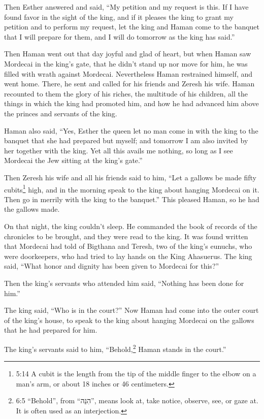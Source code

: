 \myverse{}Then Esther answered and said, “My petition and my request is this.
\myverse{}If I have found favor in the sight of the king, and if it pleases the king to
grant my petition and to perform my request, let the king and Haman come to the banquet that I will prepare
for them, and I will do tomorrow as the king has said.”

\myverse{}Then Haman went out that day joyful and glad of heart, but when
Haman saw Mordecai in the king’s gate, that he didn’t stand up nor move for him, he was filled with wrath
against Mordecai.
\myverse{}Nevertheless Haman restrained himself, and went home. There, he sent and called
for his friends and Zeresh his wife.
\myverse{}Haman recounted to them the glory of his riches, the multitude of his children,
all the things in which the king had promoted him, and how he had advanced him above the princes and servants
of the king.

\myverse{}Haman also said, “Yes, Esther the queen let no man come in with
the king to the banquet that she had prepared but myself; and tomorrow I am also invited by her together
with the king.
\myverse{}Yet all this avails me nothing, so long as I see Mordecai the Jew sitting
at the king’s gate.”

\myverse{}Then Zeresh his wife and all his friends said to him, “Let a
gallows be made fifty cubits\footnote{5:14 A cubit is the length from the tip of the middle finger to the elbow on a man’s arm, or about
	18 inches or 46 centimeters.} high, and in the morning speak to the king about hanging Mordecai
on it. Then go in merrily with the king to the banquet.” This pleased Haman, so he had the gallows made.


\mychapter{}\myverse*{}On that night, the king couldn’t sleep. He commanded the book of
records of the chronicles to be brought, and they were read to the king.
\myverse{}It was found written that Mordecai had told of Bigthana and Teresh, two of the
king’s eunuchs, who were doorkeepers, who had tried to lay hands on the King Ahasuerus.
\myverse{}The king said, “What honor and dignity has been given to Mordecai for this?”

Then the king’s servants who attended him said, “Nothing has been done for him.”

\myverse{}The king said, “Who is in the court?” Now Haman had come into the
outer court of the king’s house, to speak to the king about hanging Mordecai on the gallows that he had
prepared for him.

\myverse{}The king’s servants said to him, “Behold,\footnote{6:5 “Behold”, from “הִנֵּה”, means look at, take notice, observe, see, or gaze at. It is
	often used as an interjection.} Haman stands in the court.”

